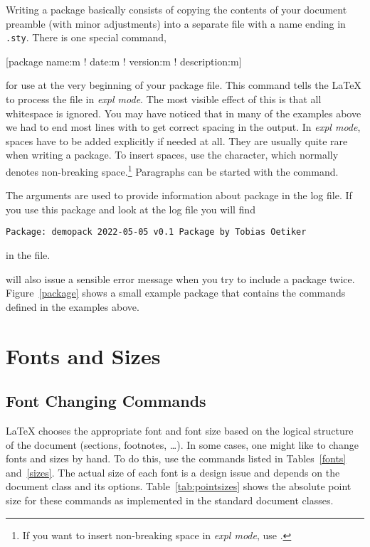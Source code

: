Writing a package basically consists of copying the contents of your document
preamble (with minor adjustments) into a separate file with a name ending in
\texttt{.sty}. There is one special command,
\begin{lscommand}
[package name:m ! date:m ! version:m ! description:m]
\end{lscommand}
\noindent for use at the very beginning of your package file. This command
tells the \LaTeX{} to process the  file in \emph{expl mode}. The most visible effect of this is
that all whitespace is ignored. You may have noticed that in many of the
examples above we had to end most lines with \ai{\%} to get correct
spacing in the output. In \emph{expl mode}, spaces have to be added explicitly if needed at all. They are usually
quite rare when writing a package. To insert spaces, use
the \ai{\~} character, which normally denotes non-breaking space.\footnote{If
  you want to insert non-breaking space in \emph{expl mode}, use
  .} Paragraphs can be started with the  command.

The arguments are used to provide information about package in the log file. If
you use this package and look at the log file you will find
\begin{verbatim}
Package: demopack 2022-05-05 v0.1 Package by Tobias Oetiker
\end{verbatim}
in the  file.

 will also issue a sensible error message when you try
to include a package twice. Figure~\ref{package} shows a small example package
that contains the commands defined in the examples above.

\section{Fonts and Sizes}\label{sec:fontsize}

\subsection{Font Changing Commands}
\LaTeX{} chooses the appropriate font
and font size based on the logical structure of the document
(sections, footnotes, \ldots).  In some cases, one might like to change
fonts and sizes by hand. To do this, use the commands listed in
Tables~\ref{fonts} and~\ref{sizes}. The actual size of each font
is a design issue and depends on the document class and its options.
Table~\ref{tab:pointsizes} shows the absolute point size for these
commands as implemented in the standard document classes.

